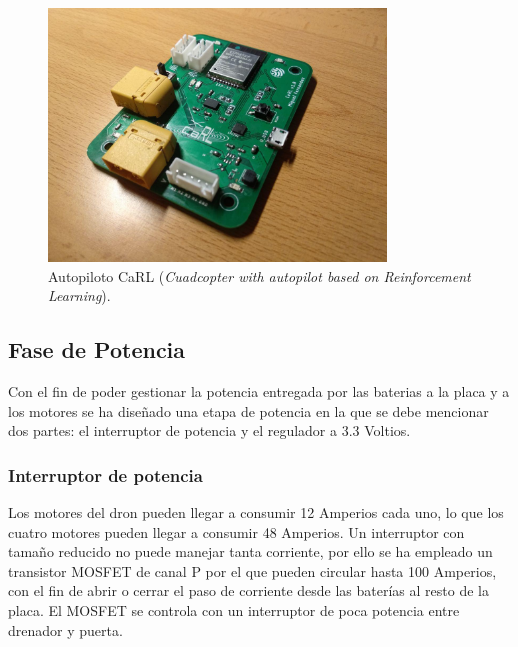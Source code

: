 \\

\begin{figure}[htb!]
	\centering
	\includegraphics[width=0.8\textwidth]{hardware/carl_board}
	\caption{Autopiloto CaRL (\textit{Cuadcopter with autopilot based on Reinforcement Learning}).}
	\label{hardware:carl_board}	
\end{figure}



\subsection{Fase de Potencia}

Con el fin de poder gestionar la potencia entregada por las baterias a la placa y a los motores se ha diseñado una etapa de potencia en la que se debe mencionar dos partes: el interruptor de potencia y el regulador a 3.3 Voltios.

\subsubsection{Interruptor de potencia}

Los motores del dron pueden llegar a consumir 12 Amperios cada uno, lo que los cuatro motores pueden llegar a consumir 48 Amperios. Un interruptor con tamaño reducido no puede manejar tanta corriente, por ello se ha empleado un transistor MOSFET de canal P por el que pueden circular hasta 100 Amperios, con el fin de abrir o cerrar el paso de corriente desde las baterías al resto de la placa. El MOSFET se controla con un interruptor de poca potencia entre drenador y puerta.\\

